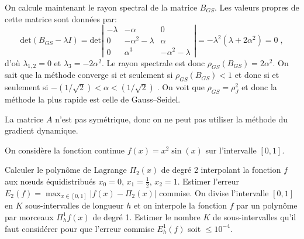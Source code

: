 \documentclass[11pt]{article}
\begin{document}
\begin{Answer}[ref={ex:3}]
\vspace{2mm}

On calcule maintenant le rayon spectral de la matrice $B_{GS}$.
Les valeurs propres de cette matrice sont donn\'ees par:
\[
  \textrm{det} (B_{GS} - \lambda I)
  =\textrm{det} \left|
                   \begin{array}{ccc}
                   -\lambda & -\alpha          & 0 \\
                        0 & -\alpha^2 -\lambda & \alpha \\
                        0 &  \alpha^3 & -\alpha^2 - \lambda
                   \end{array}
	      \right|
  = -\lambda^2 ( \lambda + 2\alpha^2) = 0\; ,
\]
d'o\`u $\lambda_{1,2} = 0$ et $\lambda_3 = - 2\alpha^2$.
Le rayon spectrale est donc $\rho_{GS} (B_{GS}) = 2\alpha^2$. On sait que la
m\'ethode converge si et seulement si $\rho_{GS} (B_{GS}) < 1$ et donc si et
seulement si $-(1/ \sqrt{2}) < \alpha < (1/ \sqrt{2}) \;$.
On voit que $\rho_{GS} = \rho_J^2$ et donc la m\'ethode la plus rapide est celle
de Gauss--Seidel.

\Question
La matrice $A$ n'est pas sym\'etrique, donc on ne peut pas utiliser
la m\'ethode du gradient dynamique.

\end{Answer}

\begin{Exercise}[label={ex:4}]

On consid\`ere la fonction continue $f(x) = x^2\sin(x)$ sur
l'intervalle $[0,1]$.

\Question
Calculer le polyn\^ome de Lagrange $\Pi_2(x)$ de degr\'e 2
interpolant la fonction $f$ aux n\oe uds \'equidistribu\'es
$x_0=0$, $x_1=\frac{1}{2}$, $x_2=1$.
\Question
Estimer l'erreur $E_2(f)=\max_{x\in[0,1]} |f(x)-\Pi_2(x)|$
commise.
\Question
On divise l'intervalle $[0,1]$ en $K$ sous-intervalles de
longueur $h$ et on interpole la fonction $f$ par un polyn\^ome
par morceaux $\Pi_h^1f(x)$ de degr\'e 1. Estimer le nombre $K$ de
sous-intervalles qu'il faut consid\'erer pour que l'erreur
commise $E_h^1(f)$ soit $\leq 10^{-4}$.
\end{Exercise}
\end{document}
